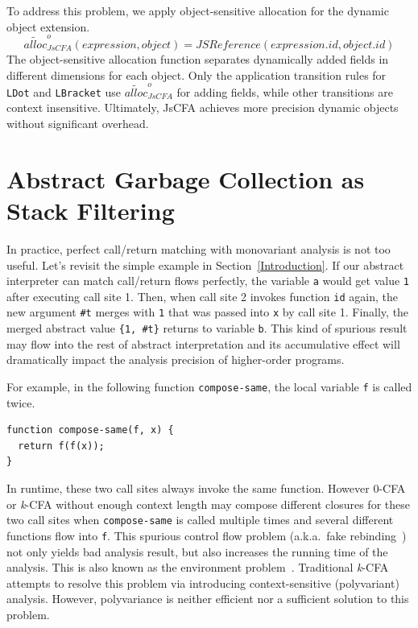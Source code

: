 \documentclass[12pt]{report}
\begin{document}
To address this problem, we apply object-sensitive allocation for the dynamic object extension.
\[
\widetilde{alloc}^{o}_{JsCFA}(expression, object) = JSReference(expression.id, object.id)
\]
The object-sensitive allocation function separates dynamically added fields in different dimensions for each object.
Only the application transition rules for \verb|LDot| and \verb|LBracket| use $\widetilde{alloc}^{o}_{JsCFA}$ for adding fields, while other transitions are context insensitive.
Ultimately, JsCFA achieves more precision dynamic objects without significant overhead.

\section{Abstract Garbage Collection as Stack Filtering}
\label{sub:filtering}
In practice, perfect call/return matching with monovariant analysis is not too useful.
Let's revisit the simple example in Section~\ref{Introduction}.
If our abstract interpreter can match call/return flows perfectly, the variable \verb|a| would get value \verb|1| after executing call site 1. Then, when call site 2 invokes function \verb|id| again, the new argument \verb|#t| merges with \verb|1| that was passed into \verb|x| by call site 1.
Finally, the merged abstract value \verb|{1, #t}| returns to variable \verb|b|.
This kind of spurious result may flow into the rest of abstract interpretation and its accumulative effect will
dramatically impact the analysis precision of higher-order programs.

For example, in the following function \verb|compose-same|, the local variable \verb|f| is called twice.
\begin{lstlisting}
function compose-same(f, x) {
  return f(f(x));
}
\end{lstlisting}
In runtime, these two call sites always invoke the same function.
However 0-CFA or \textit{k}-CFA without enough context length may compose different closures for these two call sites when \verb|compose-same| is called multiple times and several different functions flow into \verb|f|.
This spurious control flow problem (a.k.a.\ fake rebinding~\cite{vardoulakis2010cfa2}) not only yields bad analysis result, but also increases the running time of the analysis.
This is also known as the environment problem~\cite{shivers1991control}.
Traditional \textit{k}-CFA attempts to resolve this problem via introducing context-sensitive (polyvariant) analysis.
However, polyvariance is neither efficient nor a sufficient solution to this problem.
\end{document}
